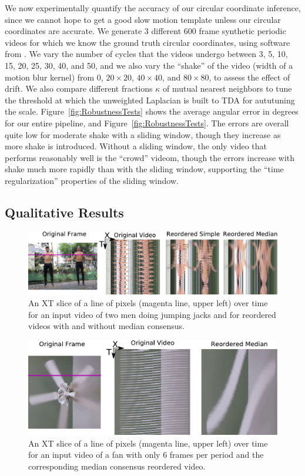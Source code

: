 \documentclass{article}
\begin{document}
We now experimentally quantify the accuracy of our circular coordinate inference, since we cannot hope to get a good slow motion template unless our circular coordinates are accurate.  We generate 3 different 600 frame synthetic periodic videos for which we know the ground truth circular coordinates, using software from \cite{jacobson2012fast}.  We vary the number of cycles that the videos undergo between 3, 5, 10, 15, 20, 25, 30, 40, and 50, and we also vary the ``shake'' of the video (width of a motion blur kernel) from 0, $20 \times 20$, $40 \times 40$, and $80 \times 80$, to assess the effect of drift.  We also compare different fractions $\kappa$ of mutual nearest neighbors to tune the threshold at which the unweighted Laplacian is built to TDA for aututuning the scale.  Figure~\ref{fig:RobustnessTests} shows the average angular error in degrees for our entire pipeline, and Figure~\ref{fig:RobustnessTests}.  The errors are overall quite low for moderate shake with a sliding window, though they increase as more shake is introduced.  Without a sliding window, the only video that performs reasonably well is the ``crowd'' videom, though the errors increase with shake much more rapidly than with the sliding window, supporting the ``time regularization'' properties of the sliding window.


\subsection{Qualitative Results}
\begin{figure}
\centering
\includegraphics[width=\columnwidth]{XTSliceJumpingJacks.pdf}
\caption{An XT slice of a line of pixels (magenta line, upper left) over time for an input video of two men doing jumping jacks and for reordered videos with and without median consensus.}
\label{fig:XTSliceJumpingJacks}
\end{figure}

\begin{figure}
\centering
\includegraphics[width=\columnwidth]{XTSliceFan.pdf}
\caption{An XT slice of a line of pixels (magenta line, upper left) over time for an input video of a fan with only 6 frames per period and the corresponding median consensus reordered video.}
\label{fig:XTSliceFan}
\end{figure}
\end{document}
